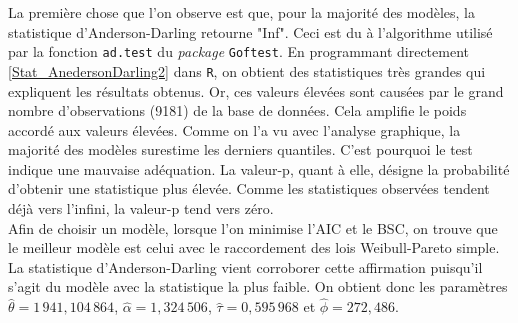 		La première chose que l'on observe est que, pour la majorité des modèles, la statistique d'Anderson-Darling retourne "Inf". Ceci est du à l'algorithme utilisé par la fonction \texttt{ad.test} du \textit{package} \texttt{Goftest}. En programmant directement \ref{Stat_AnedersonDarling2} dans \texttt{R}, on obtient des statistiques très grandes qui expliquent les résultats obtenus.	
		Or, ces valeurs élevées sont causées par le grand nombre d'observations (9181) de la base de données. Cela amplifie le poids accordé aux valeurs élevées. Comme on l'a vu avec l'analyse graphique, la majorité des modèles surestime les derniers quantiles. C'est pourquoi le test indique une mauvaise adéquation. La valeur-p, quant à elle, désigne la probabilité d'obtenir une statistique plus élevée. Comme les statistiques observées tendent déjà vers l'infini, la valeur-p tend vers zéro. \\
		
		Afin de choisir un modèle, lorsque l'on minimise l'AIC et le BSC, on trouve que le meilleur modèle est celui avec le raccordement des lois Weibull-Pareto simple. La statistique d'Anderson-Darling vient corroborer cette affirmation puisqu'il s'agit du modèle avec la statistique la plus faible. On obtient donc les paramètres $\hat{\theta}=1\,941,104\,864$, $\hat{\alpha}=1,324\,506$, $\hat{\tau}=0,595\,968$ et $\hat{\phi} = 272,486$.
		
